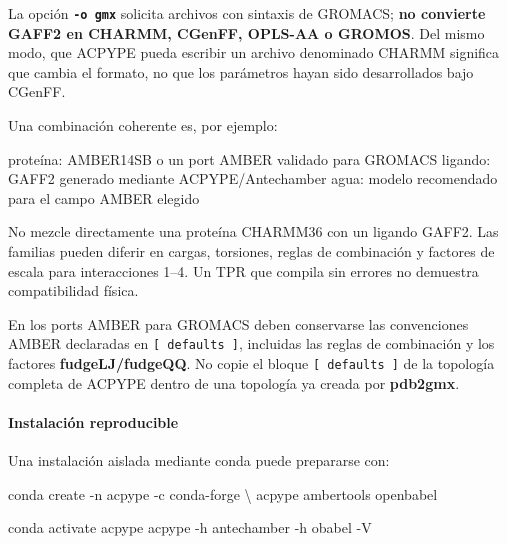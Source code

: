 \documentclass[
  spanish,
  11pt,
  a4paper]{article}
\newenvironment{Shaded}{\begin{snugshade}}{\end{snugshade}}
\newcommand{\AttributeTok}[1]{\textcolor[rgb]{0.13,0.29,0.53}{#1}}
\newcommand{\DataTypeTok}[1]{\textcolor[rgb]{0.13,0.29,0.53}{#1}}
\newcommand{\ExtensionTok}[1]{#1}
\newcommand{\NormalTok}[1]{#1}
\begin{document}
La opción \textbf{\texttt{-o\ gmx}} solicita archivos con sintaxis de
GROMACS; \textbf{no convierte GAFF2 en CHARMM, CGenFF, OPLS-AA o
GROMOS}. Del mismo modo, que ACPYPE pueda escribir un archivo denominado
CHARMM significa que cambia el formato, no que los parámetros hayan sido
desarrollados bajo CGenFF.

Una combinación coherente es, por ejemplo:

\begin{Shaded}
\begin{Highlighting}[]
\NormalTok{proteína: AMBER14SB o un port AMBER validado para GROMACS}
\NormalTok{ligando:  GAFF2 generado mediante ACPYPE/Antechamber}
\NormalTok{agua:     modelo recomendado para el campo AMBER elegido}
\end{Highlighting}
\end{Shaded}

No mezcle directamente una proteína CHARMM36 con un ligando GAFF2. Las
familias pueden diferir en cargas, torsiones, reglas de combinación y
factores de escala para interacciones 1--4. Un TPR que compila sin
errores no demuestra compatibilidad física.

En los ports AMBER para GROMACS deben conservarse las convenciones AMBER
declaradas en \texttt{{[}\ defaults\ {]}}, incluidas las reglas de
combinación y los factores \textbf{fudgeLJ/fudgeQQ}. No copie el bloque
\texttt{{[}\ defaults\ {]}} de la topología completa de ACPYPE dentro de
una topología ya creada por \textbf{pdb2gmx}.

\paragraph{Instalación reproducible}\label{instalaciuxf3n-reproducible}

Una instalación aislada mediante conda puede prepararse con:

\begin{Shaded}
\begin{Highlighting}[]
\ExtensionTok{conda}\NormalTok{ create }\AttributeTok{{-}n}\NormalTok{ acpype }\AttributeTok{{-}c}\NormalTok{ conda{-}forge }\DataTypeTok{\textbackslash{}}
\NormalTok{    acpype ambertools openbabel}

\ExtensionTok{conda}\NormalTok{ activate acpype}
\ExtensionTok{acpype} \AttributeTok{{-}h}
\ExtensionTok{antechamber} \AttributeTok{{-}h}
\ExtensionTok{obabel} \AttributeTok{{-}V}
\end{Highlighting}
\end{Shaded}
\end{document}
